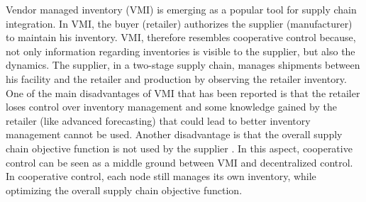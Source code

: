 Vendor managed inventory (VMI) is emerging as
a popular tool for supply chain integration. In VMI, the buyer
(retailer) authorizes the supplier (manufacturer) to maintain his
inventory. VMI, therefore resembles cooperative control because, not
only information regarding inventories is visible to the supplier, but
also the dynamics. The supplier, in a two-stage supply chain, manages
shipments between his facility and the retailer and production by
observing the retailer inventory. One of the main disadvantages of VMI
that has been reported is that the retailer loses control over
inventory management and some knowledge gained by the retailer (like
advanced forecasting) that could lead to better inventory management
cannot be used. Another disadvantage is that the overall supply chain
objective function is not used by the supplier \citep{sari:2007}. In this aspect, cooperative control can be seen as a
middle ground between VMI and decentralized control. In cooperative
control, each node still manages its own inventory, while optimizing
the overall supply chain objective function.
